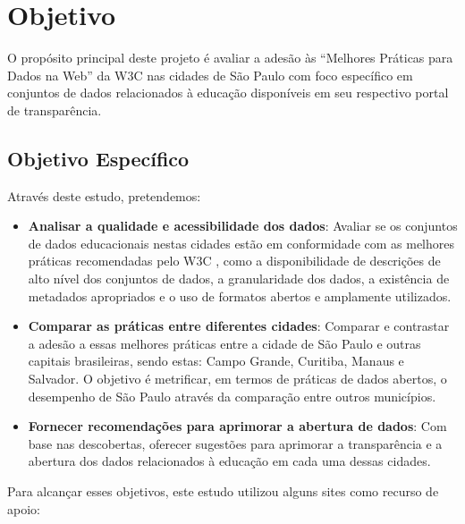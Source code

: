 \chapter{Objetivo}

O propósito principal deste projeto é avaliar a adesão às ``Melhores Práticas para Dados na Web'' da W3C \cite{W3C} nas cidades de São Paulo com foco específico em conjuntos de dados relacionados à educação disponíveis em seu respectivo portal de transparência.

\section{Objetivo Específico}

Através deste estudo, pretendemos:

\begin{itemize}
    \item \textbf{Analisar a qualidade e acessibilidade dos dados}: Avaliar se os conjuntos de dados educacionais nestas cidades estão em conformidade com as melhores práticas recomendadas pelo W3C \cite{W3CSUMMARY}, como a disponibilidade de descrições de alto nível dos conjuntos de dados, a granularidade dos dados, a existência de metadados apropriados e o uso de formatos abertos e amplamente utilizados.
    \item \textbf{Comparar as práticas entre diferentes cidades}: Comparar e contrastar a adesão a essas melhores práticas entre a cidade de São Paulo e outras capitais brasileiras, sendo estas: Campo Grande, Curitiba, Manaus e Salvador. O objetivo é metrificar, em termos de práticas de dados abertos, o desempenho de São Paulo através da comparação entre outros municípios.
    \item \textbf{Fornecer recomendações para aprimorar a abertura de dados}: Com base nas descobertas, oferecer sugestões para aprimorar a transparência e a abertura dos dados relacionados à educação em cada uma dessas cidades.
\end{itemize}

Para alcançar esses objetivos, este estudo utilizou alguns sites como recurso de apoio:

